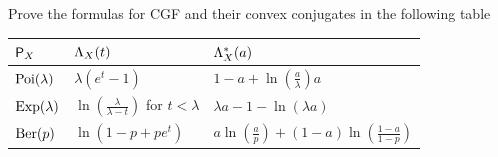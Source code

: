 \documentclass[11pt]{article}
\begin{document}
\begin{exercise}[subtitle={CGF and convex conjugate calculations}]
    \label{ex: convex conjugate calculations}
    Prove the formulas for CGF and their convex conjugates in the following
    table
    \begin{center}
    \def\arraystretch{1.2}
    \begin{tabular}{l l l}
        \toprule
        \(\mathsf{P}_X\)
        &  \(\Lambda_X(t)\) & \(\Lambda_X^*(a)\)
        \\
        \midrule
        \(\mathrm{Poi}(\lambda)\)
        & \(\lambda (e^{t} - 1)\)
        & \(1-a + \ln(\frac{a}\lambda)a\) 
        \\
        \(\mathrm{Exp}(\lambda)\)
        & \(\ln(\frac{\lambda}{\lambda - t})\) for \(t < \lambda\)
        & \(\lambda a -1 - \ln(\lambda a)\)
        \\
        \(\mathrm{Ber}(p)\)
        & \(\ln(1 - p + p e^{t})\)
        & \(a\ln(\frac{a}p) + (1-a)\ln(\frac{1-a}{1-p})\)
        \\
        \bottomrule
    \end{tabular}
    \end{center}
\end{exercise}
\end{document}
